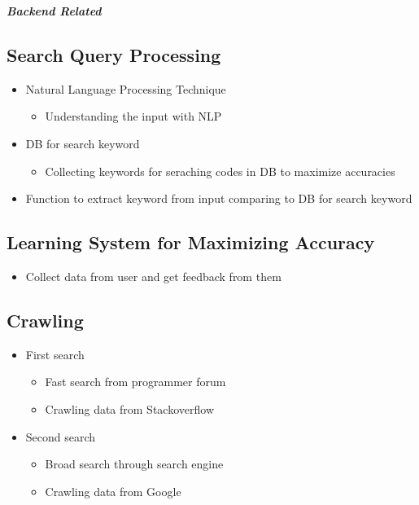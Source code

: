 \documentclass[conference]{IEEEtran}
\begin{document}
\textit{\textbf{Backend Related}}
\textit{ }

\subsection{Search Query Processing}
\begin{itemize}
  \item Natural Language Processing Technique
  \begin{itemize}
    \item Understanding the input with NLP
  \end{itemize}
  \item DB for search keyword
  \begin{itemize}
    \item Collecting keywords for seraching codes in DB to maximize accuracies
  \end{itemize}
  \item Function to extract keyword from input comparing to DB for search keyword
\end{itemize}
\textit{ }


\subsection{Learning System for Maximizing Accuracy}
\begin{itemize}
  \item Collect data from user and get feedback from them
\end{itemize}
\textit{ }


\subsection{Crawling}
\begin{itemize}
  \item First search
  \begin{itemize}
    \item Fast search from programmer forum
    \item Crawling data from Stackoverflow
  \end{itemize}
  \item Second search
  \begin{itemize}
    \item Broad search through search engine
    \item Crawling data from Google
  \end{itemize}
\end{itemize}
\textit{ }
\end{document}
